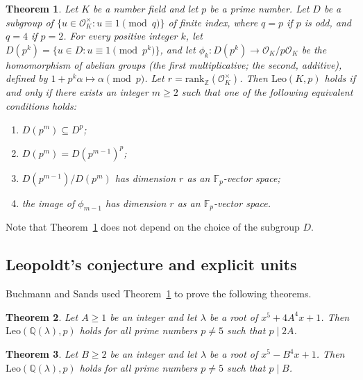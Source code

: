 \documentclass[12pt]{amsart}
\theoremstyle{plain}
\newtheorem{theorem}{Theorem}[section]
\theoremstyle{remark}
\theoremstyle{definition}
\newcommand{\Z}{\mathbb{Z}}
\newcommand{\Q}{\mathbb{Q}}
\newcommand{\F}{\mathbb{F}}
\newcommand{\rank}{\mathrm{rank}}
\newcommand{\Leo}{\mathrm{Leo}}
\numberwithin{equation}{section}
\begin{document}
\begin{theorem}\cite[$\S$II]{MR958040}\label{thm:buchmannsands}
Let $K$ be a number field and let $p$ be a prime number. 
Let $D$ be a subgroup of $\{ u \in \mathcal{O}_{K}^{\times} : u \equiv 1 \pmod{q} \}$ of finite index,
where $q=p$ if $p$ is odd, and $q=4$ if $p=2$. 
For every positive integer $k$, let $D(p^{k}) = \{u \in D : u \equiv 1 \pmod {p^{k}} \}$,
and let $\phi_{k} : D(p^{k}) \rightarrow \mathcal{O}_{K}/p\mathcal{O}_{K}$ 
be the homomorphism of abelian groups (the first multiplicative; the second, additive), defined by
$1+p^{k}\alpha \mapsto \alpha \pmod{p}$.
Let $r = \rank_{\Z}(\mathcal{O}_{K}^{\times})$.
Then $\Leo(K,p)$ holds if and only if there exists an integer $m \geq 2$ such that one of 
the following equivalent conditions holds:
\begin{enumerate}
\item $D(p^{m})\subseteq D^{p}$;
\item $D(p^{m})= D(p^{m-1})^{p}$;
\item $D(p^{m-1})/D(p^{m})$ has dimension $r$ as an $\F_{p}$-vector space;
\item the image of $\phi_{m-1}$ has dimension $r$ as an $\F_{p}$-vector space.
\end{enumerate}
\end{theorem}

Note that Theorem~\ref{thm:buchmannsands} does not depend on the choice of the subgroup $D$. 

\subsection{Leopoldt's conjecture and explicit units}
Buchmann and Sands used Theorem~\ref{thm:buchmannsands} to prove the following theorems.

\begin{theorem}{\cite[Theorem 3.3]{MR958040}}{\label{thm:BS-quintic-I}}
Let $A\geq 1$ be an integer and let $\lambda$ be a root of $x^{5}+4A^{4}x+1$. 
Then $\Leo(\Q(\lambda),p)$ holds for all prime numbers $p \neq 5$ such that $p\mid 2A$. 
\end{theorem}

\begin{theorem}{\cite[Theorem 3.4]{MR958040}}{\label{thm:BS-quintic-II}}
Let $B \geq 2$ be an integer and let $\lambda$ be a root of $x^{5}-B^{4}x+1$. 
Then $\Leo(\Q(\lambda),p)$ holds for all prime numbers $p\neq 5$ such that $p\mid B$.
\end{theorem}
\end{document}
